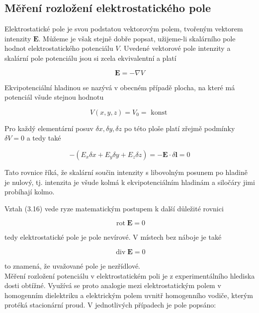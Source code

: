 \documentclass[czech,11pt,a4paper]{article}
\begin{document}
\begin{multicols}{2}
	
	\section*{Měření rozložení elektrostatického pole}
	Elektrostatické pole je svou podstatou vektorovým polem, tvořeným vektorem intenzity $\boldsymbol{E}$. Můžeme je však stejně dobře popsat, užijeme-li skalárního pole hodnot elektrostatického potenciálu $V$. Uvedené vektorové pole intenzity a skalární pole potenciálu jsou si zcela ekvivalentní a platí
	
	
	\begin{equation*}
		\boldsymbol{E}=-\nabla V \tag{3.16}
	\end{equation*}
	
	
	Ekvipotenciální hladinou se nazývá v obecném případě plocha, na které má potenciál všude stejnou hodnotu
	
	
	\begin{equation*}
		V(x, y, z)=V_{0}=\text { konst } \tag{3.17}
	\end{equation*}
	
	
	Pro každý elementární posuv $\delta x, \delta y, \delta z$ po této ploše platí zřejmě podmínky $\delta V=0$ a tedy také
	
	
	\begin{equation*}
		-\left(E_{x} \delta x+E_{y} \delta y+E_{z} \delta z\right)=-\boldsymbol{E} \cdot \delta \boldsymbol{l}=0 \tag{3.18}
	\end{equation*}
	
	
	Tato rovnice říká, že skalární součin intenzity s libovolným posunem po hladině je nulový, tj. intenzita je všude kolmá k ekvipotenciálním hladinám a siločáry jimi probíhají kolmo.
	
	Vztah (3.16) vede ryze matematickým postupem k další důležité rovnici
	
	
	\begin{equation*}
		\operatorname{rot} \boldsymbol{E}=0 \tag{3.19}
	\end{equation*}
	
	
	tedy elektrostatické pole je pole nevírové. V místech bez náboje je také
	
	
	\begin{equation*}
		\operatorname{div} \boldsymbol{E}=0 \tag{3.20}
	\end{equation*}
	
	
	to znamená, že uvažované pole je nezřídlové.\\
	Měření rozložení potenciálu v elektrostatickém poli je z experimentálního hlediska dosti obtížné. Využívá se proto analogie mezi elektrostatickým polem v homogenním dielektriku a elektrickým polem uvnitř homogenního vodiče, kterým protéká stacionární proud. V jednotlivých případech je pole popsáno:
	

\end{multicols}
\end{document}
